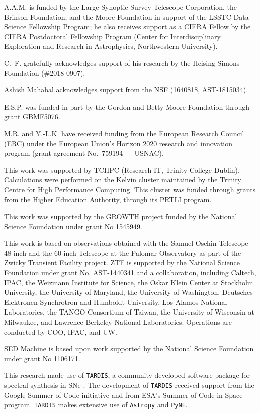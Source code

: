 \documentclass[twocolumn]{aastex63}
\begin{document}
A.A.M. is funded by the Large Synoptic Survey Telescope Corporation, the
Brinson Foundation, and the Moore Foundation in support of the LSSTC Data
Science Fellowship Program; he also receives support as a CIERA Fellow by the
CIERA Postdoctoral Fellowship Program (Center for Interdisciplinary
Exploration and Research in Astrophysics, Northwestern University).

C.~F. gratefully acknowledges support of his research by the
Heising-Simons Foundation (\#2018-0907).

Ashish Mahabal acknowledges support from the NSF (1640818, AST-1815034).

E.S.P. was funded in part by the Gordon and Betty Moore Foundation
through grant GBMF5076.

M.R. and Y.-L.K. have received funding from the European Research
Council (ERC) under the European Union’s Horizon 2020 research and innovation
program (grant agreement No.\ 759194 — USNAC).

This work was supported by TCHPC (Research IT, Trinity College Dublin).
Calculations were performed on the Kelvin cluster maintained by the Trinity
Centre for High Performance Computing. This cluster was funded through grants
from the Higher Education Authority, through its PRTLI program.

This work was supported by the GROWTH project funded by the National Science
Foundation under grant No 1545949.

This work is based on observations obtained with the Samuel Oschin Telescope
48 inch and the 60 inch Telescope at the Palomar Observatory as part of the
Zwicky Transient Facility project. ZTF is supported by the National Science
Foundation under grant No. AST-1440341 and a collaboration, including Caltech,
IPAC, the Weizmann Institute for Science, the Oskar Klein Center at Stockholm
University, the University of Maryland, the University of Washington,
Deutsches Elektronen-Synchrotron and Humboldt University, Los Alamos National
Laboratories, the TANGO Consortium of Taiwan, the University of Wisconsin at
Milwaukee, and Lawrence Berkeley National Laboratories. Operations are
conducted by COO, IPAC, and UW.

SED Machine is based upon work supported by the National Science Foundation
under grant No 1106171.

This research made use of \texttt{TARDIS}, a community-developed software
package for spectral synthesis in SNe \citep{Kerzendorf14}. The development of
\texttt{TARDIS} received support from the Google Summer of Code initiative and
from ESA's Summer of Code in Space program. \texttt{TARDIS} makes extensive
use of \texttt{Astropy} and \texttt{PyNE}.
\end{document}
